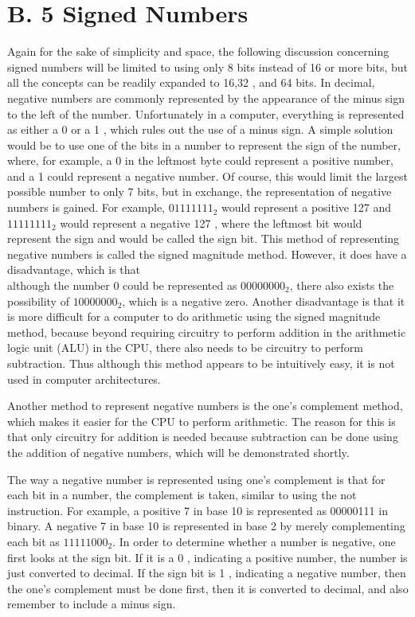 \documentclass[10pt]{article}
\begin{document}
\section*{B. 5 Signed Numbers}
Again for the sake of simplicity and space, the following discussion concerning signed numbers will be limited to using only 8 bits instead of 16 or more bits, but all the concepts can be readily expanded to 16,32 , and 64 bits. In decimal, negative numbers are commonly represented by the appearance of the minus sign to the left of the number. Unfortunately in a computer, everything is represented as either a 0 or a 1 , which rules out the use of a minus sign. A simple solution would be to use one of the bits in a number to represent the sign of the number, where, for example, a 0 in the leftmost byte could represent a positive number, and a 1 could represent a negative number. Of course, this would limit the largest possible number to only 7 bits, but in exchange, the representation of negative numbers is gained. For example, $01111111_{2}$ would represent a positive 127 and $11111111_{2}$ would represent a negative 127 , where the leftmost bit would represent the sign and would be called the sign bit. This method of representing negative numbers is called the signed magnitude method. However, it does have a disadvantage, which is that\\
although the number 0 could be represented as $00000000_{2}$, there also exists the possibility of $10000000_{2}$, which is a negative zero. Another disadvantage is that it is more difficult for a computer to do arithmetic using the signed magnitude method, because beyond requiring circuitry to perform addition in the arithmetic logic unit (ALU) in the CPU, there also needs to be circuitry to perform subtraction. Thus although this method appears to be intuitively easy, it is not used in computer architectures.

Another method to represent negative numbers is the one's complement method, which makes it easier for the CPU to perform arithmetic. The reason for this is that only circuitry for addition is needed because subtraction can be done using the addition of negative numbers, which will be demonstrated shortly.

The way a negative number is represented using one's complement is that for each bit in a number, the complement is taken, similar to using the not instruction. For example, a positive 7 in base 10 is represented as 00000111 in binary. A negative 7 in base 10 is represented in base 2 by merely complementing each bit as $11111000_{2}$. In order to determine whether a number is negative, one first looks at the sign bit. If it is a 0 , indicating a positive number, the number is just converted to decimal. If the sign bit is 1 , indicating a negative number, then the one's complement must be done first, then it is converted to decimal, and also remember to include a minus sign.
\end{document}
